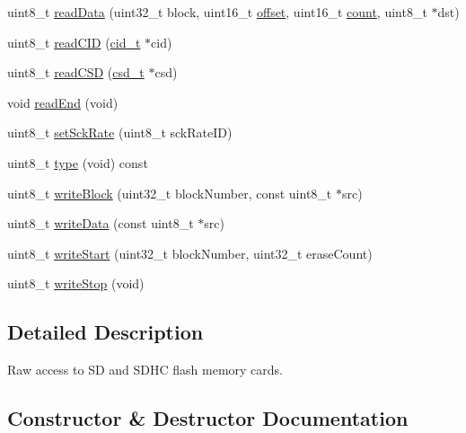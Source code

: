 \begin{DoxyCompactItemize}
\item 
uint8\+\_\+t \hyperlink{class_sd2_card_ae2d1396ad30081b4201cd372358ef699}{read\+Data} (uint32\+\_\+t block, uint16\+\_\+t \hyperlink{_time_g_p_s_8ino_a55e90916d2856d0f1c72387a5334ff9a}{offset}, uint16\+\_\+t \hyperlink{_w_s_8ino_ad43c3812e6d13e0518d9f8b8f463ffcf}{count}, uint8\+\_\+t $\ast$dst)
\item 
uint8\+\_\+t \hyperlink{class_sd2_card_aee2be03d649548e2ab26033f18638d19}{read\+C\+ID} (\hyperlink{_sd_info_8h_a7f1c4653597f0e5276671139a3592dcd}{cid\+\_\+t} $\ast$cid)
\item 
uint8\+\_\+t \hyperlink{class_sd2_card_a79845d8d4593cb3b1b7641ba27edddfb}{read\+C\+SD} (\hyperlink{unioncsd__t}{csd\+\_\+t} $\ast$csd)
\item 
void \hyperlink{class_sd2_card_a0de961537d051bbcafd87ed9fff5fe48}{read\+End} (void)
\item 
uint8\+\_\+t \hyperlink{class_sd2_card_ad849b8896de9abd4e24bd98f4204ccc4}{set\+Sck\+Rate} (uint8\+\_\+t sck\+Rate\+ID)
\item 
uint8\+\_\+t \hyperlink{class_sd2_card_acaaebba61c53eb3925457c563f56bb1a}{type} (void) const
\item 
uint8\+\_\+t \hyperlink{class_sd2_card_ae9bdd6cff43b8b694584f9bae7e781b0}{write\+Block} (uint32\+\_\+t block\+Number, const uint8\+\_\+t $\ast$src)
\item 
uint8\+\_\+t \hyperlink{class_sd2_card_af602d107e1ead2d0971e9f4c7b744cf8}{write\+Data} (const uint8\+\_\+t $\ast$src)
\item 
uint8\+\_\+t \hyperlink{class_sd2_card_a82a21a07fdfe45c5c75d486a13cded8a}{write\+Start} (uint32\+\_\+t block\+Number, uint32\+\_\+t erase\+Count)
\item 
uint8\+\_\+t \hyperlink{class_sd2_card_a3a60481c0821606546a85d056bb96f47}{write\+Stop} (void)
\end{DoxyCompactItemize}


\subsection{Detailed Description}
Raw access to SD and S\+D\+HC flash memory cards. 

\subsection{Constructor \& Destructor Documentation}
\mbox{\label{class_sd2_card_af85a5ec4f5f4ec89deb8936c3fd7de65}} 
